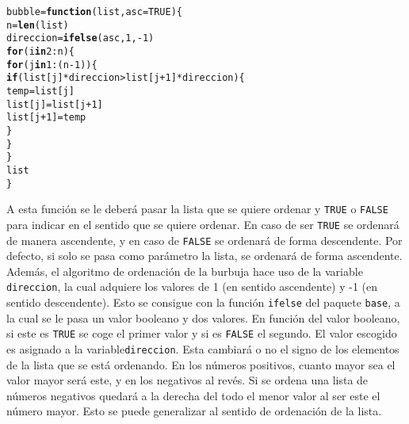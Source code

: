 \documentclass[12pt]{report}\usepackage[]{graphicx}\usepackage[dvipsnames]{xcolor}
\makeatletter
\newcommand{\hlnum}[1]{\textcolor[rgb]{0.686,0.059,0.569}{#1}}%
\newcommand{\hlopt}[1]{\textcolor[rgb]{0,0,0}{#1}}%
\newcommand{\hlstd}[1]{\textcolor[rgb]{0.345,0.345,0.345}{#1}}%
\newcommand{\hlkwa}[1]{\textcolor[rgb]{0.161,0.373,0.58}{\textbf{#1}}}%
\newcommand{\hlkwb}[1]{\textcolor[rgb]{0.69,0.353,0.396}{#1}}%
\newcommand{\hlkwc}[1]{\textcolor[rgb]{0.333,0.667,0.333}{#1}}%
\newcommand{\hlkwd}[1]{\textcolor[rgb]{0.737,0.353,0.396}{\textbf{#1}}}%
\newenvironment{kframe}{%
 \def\at@end@of@kframe{}%
 \ifinner\ifhmode%
  \def\at@end@of@kframe{\end{minipage}}%
  \begin{minipage}{\columnwidth}%
 \fi\fi%
 \def\FrameCommand##1{\hskip\@totalleftmargin \hskip-\fboxsep
 \colorbox{shadecolor}{##1}\hskip-\fboxsep
     \hskip-\linewidth \hskip-\@totalleftmargin \hskip\columnwidth}%
 \MakeFramed {\advance\hsize-\width
   \@totalleftmargin\z@ \linewidth\hsize
   \@setminipage}}%
 {\par\unskip\endMakeFramed%
 \at@end@of@kframe}
\newenvironment{knitrout}{}{} %
\makeatother
\begin{document}
\begin{knitrout}
\color{fgcolor}\begin{kframe}
\begin{alltt}
\hlstd{bubble} \hlkwb{=} \hlkwa{function}\hlstd{(}\hlkwc{list}\hlstd{,} \hlkwc{asc} \hlstd{=} \hlnum{TRUE}\hlstd{)\{}
        \hlstd{n} \hlkwb{=} \hlkwd{len}\hlstd{(list)}
        \hlstd{direccion} \hlkwb{=} \hlkwd{ifelse}\hlstd{(asc,} \hlnum{1}\hlstd{,} \hlopt{-}\hlnum{1}\hlstd{)}
        \hlkwa{for} \hlstd{(i} \hlkwa{in} \hlnum{2}\hlopt{:}\hlstd{n)\{}
                \hlkwa{for} \hlstd{(j} \hlkwa{in} \hlnum{1}\hlopt{:}\hlstd{(n}\hlopt{-}\hlnum{1}\hlstd{))\{}
                        \hlkwa{if} \hlstd{(list[j]} \hlopt{*} \hlstd{direccion} \hlopt{>} \hlstd{list[j}\hlopt{+}\hlnum{1}\hlstd{]} \hlopt{*} \hlstd{direccion)\{}
                                \hlstd{temp} \hlkwb{=} \hlstd{list[j]}
                                \hlstd{list[j]} \hlkwb{=} \hlstd{list[j}\hlopt{+}\hlnum{1}\hlstd{]}
                                \hlstd{list[j}\hlopt{+}\hlnum{1}\hlstd{]} \hlkwb{=} \hlstd{temp}
                        \hlstd{\}}
                \hlstd{\}}
        \hlstd{\}}
        \hlstd{list}
\hlstd{\}}
\end{alltt}
\end{kframe}
\end{knitrout}
			
			A esta función se le deberá pasar la lista que se quiere ordenar y \texttt{TRUE} o \texttt{FALSE} para indicar en el sentido que se quiere ordenar. En caso de ser \texttt{TRUE} se ordenará de manera ascendente, y en caso de \texttt{FALSE} se ordenará de forma descendente. Por defecto, si solo se pasa como parámetro la lista, se ordenará de forma ascendente.\\
			
			Además, el algoritmo de ordenación de la burbuja hace uso de la variable \texttt{direccion}, la cual adquiere los valores de 1 (en sentido ascendente) y -1 (en sentido descendente). Esto se consigue con la función \texttt{ifelse} del paquete \texttt{base}, a la cual se le pasa un valor booleano y dos valores. En función del valor booleano, si este es \texttt{TRUE} se coge el primer valor y si es \texttt{FALSE} el segundo. El valor escogido es asignado a la variable\texttt{direccion}. Esta cambiará o no el signo de los elementos de la lista que se está ordenando. En los números positivos, cuanto mayor sea el valor mayor será este, y en los negativos al revés. Si se ordena una lista de números negativos quedará a la derecha del todo el menor valor al ser este el número mayor. Esto se puede generalizar al sentido de ordenación de la lista.\\
			
\end{document}

